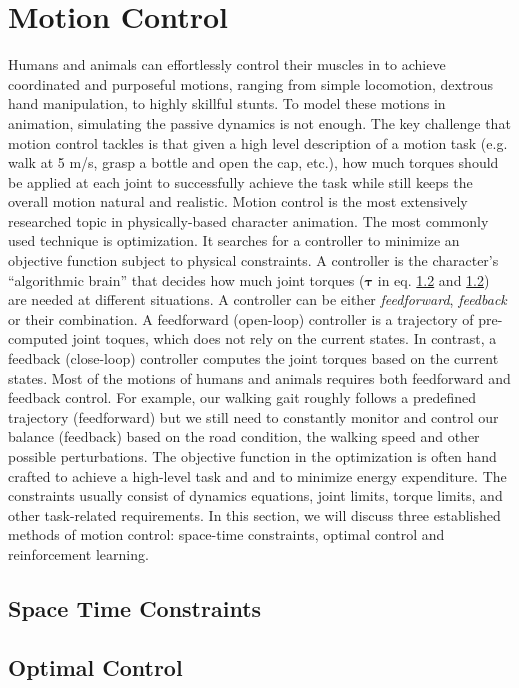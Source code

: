 \section{Motion Control}
Humans and animals can effortlessly control their muscles in to achieve coordinated and purposeful motions, ranging from simple locomotion, dextrous hand manipulation, to highly skillful stunts. To model these motions in animation, simulating the passive dynamics is not enough. The key challenge that motion control tackles is that given a high level description of a motion task (e.g. walk at 5 m/s, grasp a bottle and open the cap, etc.), how much torques should be applied at each joint to successfully achieve the task while still keeps the overall motion natural and realistic. Motion control is the most extensively researched topic in physically-based character animation. The most commonly used technique is optimization. It searches for a controller to minimize an objective function subject to physical constraints. A controller is the character's ``algorithmic brain'' that decides how much joint torques ($\boldsymbol{\tau}$ in eq. \ref{} and \ref{}) are needed at different situations. A controller can be either \emph{feedforward}, \emph{feedback} or their combination. A feedforward (open-loop) controller is a trajectory of pre-computed joint toques, which does not rely on the current states. In contrast, a feedback (close-loop) controller computes the joint torques based on the current states. Most of the motions of humans and animals requires both feedforward and feedback control. For example, our walking gait roughly follows a predefined trajectory (feedforward) but we still need to constantly monitor and control our balance (feedback) based on the road condition, the walking speed and other possible perturbations. The objective function in the optimization is often hand crafted to achieve a high-level task and and to minimize energy expenditure. The constraints usually consist of dynamics equations, joint limits, torque limits, and other task-related requirements. In this section, we will discuss three established methods of motion control: space-time constraints, optimal control and reinforcement learning.

\subsection{Space Time Constraints}
\subsection{Optimal Control}
